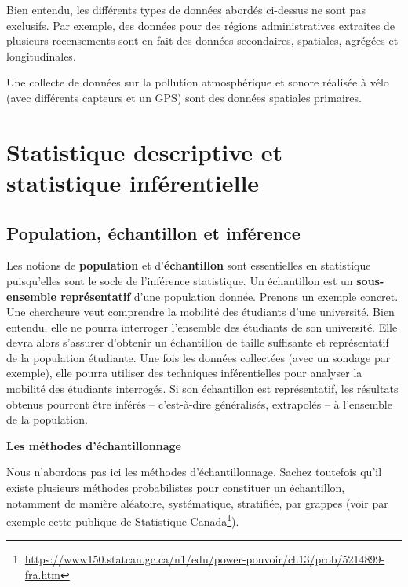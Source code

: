\documentclass[
  11pt,
  french,
]{book}
\makeatletter
\renewcommand{\href}[2]{#2\footnote{\url{#1}}}
\newenvironment{kframev}{%
\medskip{}
\setlength{\fboxsep}{.8em}
 \def\at@end@of@kframev{}%
 \ifinner\ifhmode%
  \def\at@end@of@kframev{\end{minipage}}%
  \begin{minipage}{\columnwidth}%
 \fi\fi%
 \def\FrameCommand##1{\hskip\@totalleftmargin \hskip-\fboxsep
 \colorbox{shadebluecolor}{##1}\hskip-\fboxsep
     \hskip-\linewidth \hskip-\@totalleftmargin \hskip\columnwidth}%
 \MakeFramed {\advance\hsize-\width
   \@totalleftmargin\z@ \linewidth\hsize
   \@setminipage}}%
 {\par\unskip\endMakeFramed%
 \at@end@of@kframev}
\newenvironment{rmdblock}[1]
  {
  \begin{itemize}
  \renewcommand{\labelitemi}{
    \raisebox{-.7\height}[0pt][0pt]{
      {\setkeys{Gin}{width=3em,keepaspectratio}\texttt{[image: images/\#1]}}
    }
  }
  \setlength{\fboxsep}{1em}
  \begin{kframev}
  \small
  \item
  }
  {
  \end{kframev}
  \end{itemize}
  }
\newenvironment{bloc_notes}
  {\begin{rmdblock}{notes}}
  {\end{rmdblock}}
\newenvironment{bloc_aller_loin}
  {\begin{rmdblock}{aller_loin}}
  {\end{rmdblock}}
\makeatother
\begin{document}
\begin{bloc_notes}

Bien entendu, les différents types de données abordés ci-dessus ne sont pas exclusifs. Par exemple, des données pour des régions administratives extraites de plusieurs recensements sont en fait des données secondaires, spatiales, agrégées et longitudinales.

Une collecte de données sur la pollution atmosphérique et sonore réalisée à vélo (avec différents capteurs et un GPS) sont des données spatiales primaires.

\end{bloc_notes}

\hypertarget{sect023}{%
\section{Statistique descriptive et statistique inférentielle}\label{sect023}}

\hypertarget{sect0231}{%
\subsection{Population, échantillon et inférence}\label{sect0231}}

Les notions de \textbf{population} et d'\textbf{échantillon} sont essentielles en statistique puisqu'elles sont le socle de l'inférence statistique.
Un échantillon est un \textbf{sous-ensemble représentatif} d'une population donnée. Prenons un exemple concret. Une chercheure veut comprendre la mobilité des étudiants d'une université. Bien entendu, elle ne pourra interroger l'ensemble des étudiants de son université. Elle devra alors s'assurer d'obtenir un échantillon de taille suffisante et représentatif de la population étudiante. Une fois les données collectées (avec un sondage par exemple), elle pourra utiliser des techniques inférentielles pour analyser la mobilité des étudiants interrogés. Si son échantillon est représentatif, les résultats obtenus pourront être inférés -- c'est-à-dire généralisés, extrapolés -- à l'ensemble de la population.

\begin{bloc_aller_loin}

\textbf{Les méthodes d'échantillonnage}

Nous n'abordons pas ici les méthodes d'échantillonnage. Sachez toutefois qu'il existe plusieurs méthodes probabilistes pour constituer un échantillon, notamment de manière aléatoire, systématique, stratifiée, par grappes (\href{https://www150.statcan.gc.ca/n1/edu/power-pouvoir/ch13/prob/5214899-fra.htm}{voir par exemple cette publique de Statistique Canada}).

\end{bloc_aller_loin}
\end{document}
